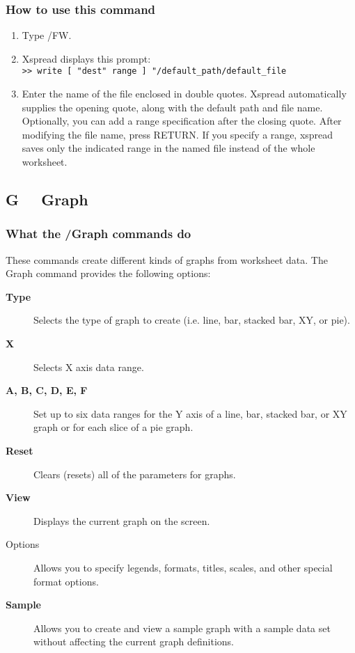 \subsubsection*{How to use this command}
\begin{enumerate}
\item{Type /FW.}
\item{Xspread displays this prompt:\\
	\verb|>> write [ "dest" range ] "/default_path/default_file|\\}
\item{Enter the name of the file enclosed in double quotes.  Xspread
automatically supplies the opening quote, along with the default
path and file name.  Optionally, you can add 
a range specification after the closing quote.  After modifying
the file name, press RETURN.  If you specify a range, xspread 
saves only the indicated range in the named file instead of the 
whole worksheet.}
\end{enumerate}


\subsection*{G  \ \     Graph}

\subsubsection*{        What the /Graph commands do}
        These commands create different kinds of graphs from worksheet data.
        The Graph command provides the following options:
\begin{description}
\item[{\bf Type}]{    Selects the type of graph to create (i.e. line, bar, stacked
                bar, XY, or pie). }
\item[{\bf X}]{      Selects X axis data range.}
\item[{\bf A, B, C, D, E, F}]{Set up to six data ranges for the Y axis
                of a line, bar, stacked bar, or XY graph or 
		for each slice of a pie graph.}
\item[{\bf Reset}]{   Clears (resets) all of the parameters for graphs.}
\item[{\bf View}]{    Displays the current graph on the screen.}
\item[{Options}]{ Allows you to specify legends, formats, titles, scales, and
                other special format options.}
\item[{\bf Sample}]{ Allows you to create and view a sample graph with a sample
		data set without affecting the current graph definitions.}
\end{description}

